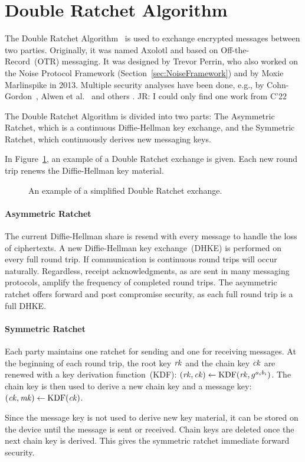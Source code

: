 \section{Double Ratchet Algorithm}

The Double Ratchet Algorithm~\cite{DoubleRatchetAlg} is used to exchange encrypted messages between two parties.
Originally, it was named Axolotl and based on Off-the-Record~(OTR) messaging.
It was designed by Trevor Perrin, who also worked on the Noise Protocol Framework (Section~\ref{sec:NoiseFramework}) and by Moxie Marlinspike in 2013.
Multiple security analyses have been done, e.g., by Cohn-Gordon~\cite{EUROSP:CCDGS17}, Alwen et al.~\cite{EC:AlwCorDod19} and others \cite{C:BFGMR22}. \alert{JR: I could only find one work from C'22}

The Double Ratchet Algorithm is divided into two parts:
The Asymmetric Ratchet, which is a continuous Diffie-Hellman key exchange, and the Symmetric Ratchet, which continuously derives new messaging keys.

In Figure~\ref{fig:double-ratchet:double_ratchet}, an example of a Double Ratchet exchange is given.
Each new round trip renews the Diffie-Hellman key material.

\begin{figure}[!ht]
    \centering
    
    \caption{An example of a simplified Double Ratchet exchange.}
    \label{fig:double-ratchet:double_ratchet}
\end{figure}

\paragraph{Asymmetric Ratchet}
The current Diffie-Hellman share is resend with every message to handle the loss of ciphertexts.
A new Diffie-Hellman key exchange~(DHKE) is performed on every full round trip.
If communication is continuous round trips will occur naturally.
Regardless, receipt acknowledgments, as are sent in many messaging protocols, amplify the frequency of completed round trips.
The asymmetric ratchet offers forward and post compromise security, as each full round trip is a full DHKE.

\paragraph{Symmetric Ratchet}
Each party maintains one ratchet for sending and one for receiving messages.
At the beginning of each round trip, the root key $\mathit{rk}$ and the chain key $\mathit{ck}$ are renewed with a key derivation function~(KDF): $(\mathit{rk}, \mathit{ck})\gets\mathrm{KDF}(\mathit{rk}, g^{a_i b_i})$.
The chain key is then used to derive a new chain key and a message key: $(\mathit{ck}, \mathit{mk})\gets\mathrm{KDF}(\mathit{ck})$.

Since the message key is not used to derive new key material, it can be stored on the device until the message is sent or received.
Chain keys are deleted once the next chain key is derived.
This gives the symmetric ratchet immediate forward security.

